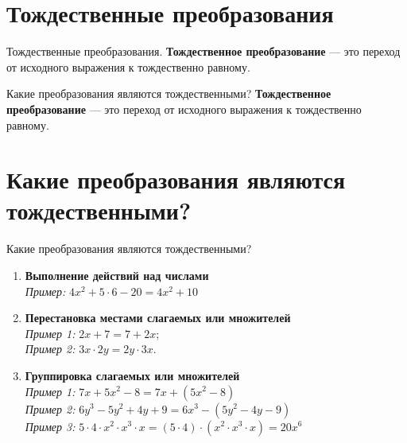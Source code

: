 \documentclass[12pt, aspectratio=169]{beamer}
\begin{document}
\section{Тождественные преобразования}

\begin{frame}{Тождественные преобразования.}
	\textbf{Тождественное преобразование} — это переход от исходного выражения к тождественно равному.
\end{frame}

\begin{frame}{Какие преобразования являются тождественными?}
	\textbf{Тождественное преобразование} — это переход от исходного выражения к тождественно равному.
\end{frame}

\section{Какие преобразования являются тождественными?}

\begin{frame}{Какие преобразования являются тождественными?}
	\begin{enumerate}
		\item<1-> {\textbf{Выполнение действий над числами}\\
			\textit{Пример:} $4x^2+5\cdot6-20=4x^2+10$}
		\item<2-> {\textbf{Перестановка местами слагаемых или множителей}\\
			\textit{Пример 1:} $2x+7=7+2x$;\\
			\textit{Пример 2:} $3x\cdot 2y=2y\cdot 3x$.
		}
		\item<3-> {
			\textbf{Группировка слагаемых или множителей}\\
			\textit{Пример 1:} $7x+5x^2-8=7x+(5x^2-8)$\\
			\textit{Пример 2:} $6y^3-5y^2+4y+9=6x^3-(5y^2-4y-9)$\\
			\textit{Пример 3:} $5\cdot4\cdot x^2\cdot x^3\cdot x=(5\cdot4)\cdot(x^2\cdot x^3\cdot x)=20x^6$
		}
	\end{enumerate}
\end{frame}
\end{document}
